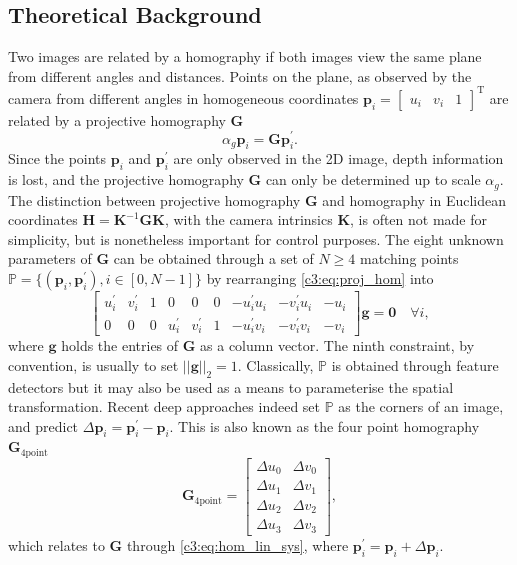 \subsection{Theoretical Background}
Two images are related by a homography if both images view the same plane from different angles and distances. Points on the plane, as observed by the camera from different angles in homogeneous coordinates $\mathbf{p}_i = \begin{bmatrix}u_i&v_i&1\end{bmatrix}^\text{T}$ are related by a projective homography $\mathbf{G}$ \cite{malis2007deeper}
\begin{equation}
    \alpha_g\mathbf{p}_i = \mathbf{G}\mathbf{p}_i^\prime.
    \label{c3:eq:proj_hom}
\end{equation}
Since the points $\mathbf{p}_i$ and $\mathbf{p}_i^\prime$ are only observed in the 2D image, depth information is lost, and the projective homography $\mathbf{G}$ can only be determined up to scale $\alpha_g$. The distinction between projective homography $\mathbf{G}$ and homography in Euclidean coordinates $\mathbf{H} = \mathbf{K}^{-1}\mathbf{G}\mathbf{K}$, with the camera intrinsics $\mathbf{K}$, is often not made for simplicity, but is nonetheless important for control purposes. The eight unknown parameters of $\mathbf{G}$ can be obtained through a set of $N\geq4$ matching points $\mathbb{P} = \{(\mathbf{p}_i, \mathbf{p}^\prime_i), i\in[0,N-1]\}$ by rearranging \eqref{c3:eq:proj_hom} into
\begin{equation}
    \begin{bmatrix}
        u^\prime_i & v^\prime_i & 1 & 0   &   0 & 0 & -u^\prime_i u_i & -v^\prime_i u_i & -u_i \\
        0   &   0 & 0 & u^\prime_i & v^\prime_i & 1 & -u^\prime_i v_i & -v^\prime_i v_i & - v_i
    \end{bmatrix}\mathbf{g}= \mathbf{0}\quad\forall i,
    \label{c3:eq:hom_lin_sys}
\end{equation}
where $\mathbf{g}$ holds the entries of $\mathbf{G}$ as a column vector. The ninth constraint, by convention, is usually to set $||\mathbf{g}||_2 = 1$. Classically, $\mathbb{P}$ is obtained through feature detectors but it may also be used as a means to parameterise the spatial transformation.
Recent deep approaches indeed set $\mathbb{P}$ as the corners of an image, and predict $\Delta \mathbf{p}_i = \mathbf{p}^\prime_i - \mathbf{p}_i$. This is also known as the four point homography $\mathbf{G}_{4\text{point}}$
\begin{equation}
    \mathbf{G}_{4\text{point}} = \begin{bmatrix}
        \Delta u_0 & \Delta v_0 \\
        \Delta u_1 & \Delta v_1 \\
        \Delta u_2 & \Delta v_2 \\
        \Delta u_3 & \Delta v_3
    \end{bmatrix},
    \label{c3:eq:4pt}
\end{equation}
which relates to $\mathbf{G}$ through \eqref{c3:eq:hom_lin_sys}, where $\mathbf{p}^\prime_i = \mathbf{p}_i + \Delta \mathbf{p}_i$.    


